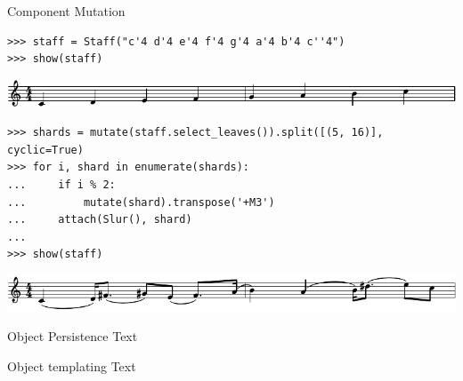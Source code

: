 \begin{frame}[fragile]{Component Mutation}

\begin{abjadbookoutput}
\begin{singlespacing}
\vspace{-0.5\baselineskip}
\begin{verbatim}
>>> staff = Staff("c'4 d'4 e'4 f'4 g'4 a'4 b'4 c''4")
>>> show(staff)
\end{verbatim}
\noindent\includegraphics[max width=\textwidth,]{assets/lilypond-2037c19c781fc60f587ffb811c73bee9.pdf}
\begin{verbatim}
>>> shards = mutate(staff.select_leaves()).split([(5, 16)], cyclic=True)
>>> for i, shard in enumerate(shards):
...     if i % 2:
...         mutate(shard).transpose('+M3')
...     attach(Slur(), shard)
...
>>> show(staff)
\end{verbatim}
\noindent\includegraphics[max width=\textwidth,]{assets/lilypond-d1d1b132557a6e06aabb2a560d1d258e.pdf}
\end{singlespacing}
\end{abjadbookoutput}

\end{frame}

\begin{frame}[fragile]{Object Persistence}
Text
\end{frame}

\begin{frame}[fragile]{Object templating}
Text
\end{frame}